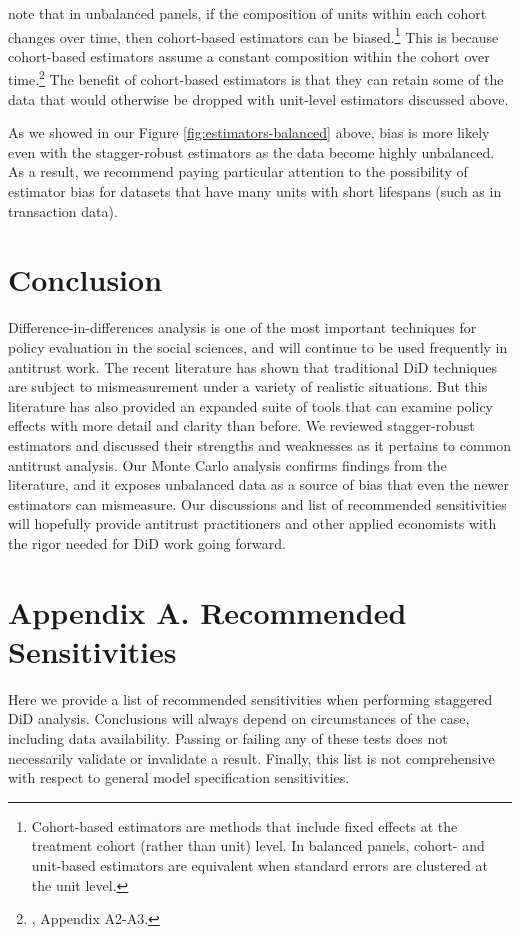 \documentclass[12pt]{article}
\begin{document}
\citet{borusyak2024revisiting} note that in unbalanced panels, if the composition of units within each cohort changes over time, then cohort-based estimators can be biased.\footnote{Cohort-based estimators are methods that include fixed effects at the treatment cohort (rather than unit) level. In balanced panels, cohort- and unit-based estimators are equivalent when standard errors are clustered at the unit level.}  This is because cohort-based estimators assume a constant composition within the cohort over time.\footnote{\citet{borusyak2024revisiting}, Appendix A2-A3.}  The benefit of cohort-based estimators is that they can retain some of the data that would otherwise be dropped with unit-level estimators discussed above.

As we showed in our Figure \ref{fig:estimators-balanced} above, bias is more likely even with the stagger-robust estimators as the data become highly unbalanced. As a result, we recommend paying particular attention to the possibility of estimator bias for datasets that have many units with short lifespans (such as in transaction data).

\section{Conclusion} \label{sec:conclusion}
Difference-in-differences analysis is one of the most important techniques for policy evaluation in the social sciences, and will continue to be used frequently in antitrust work. The recent literature has shown that traditional DiD techniques are subject to mismeasurement under a variety of realistic situations. But this literature has also provided an expanded suite of tools that can examine policy effects with more detail and clarity than before. We reviewed stagger-robust estimators and discussed their strengths and weaknesses as it pertains to common antitrust analysis. Our Monte Carlo analysis confirms findings from the literature, and it exposes unbalanced data as a source of bias that even the newer estimators can mismeasure. Our discussions and list of recommended sensitivities will hopefully provide antitrust practitioners and other applied economists with the rigor needed for DiD work going forward.

\newpage
\doublespace
\printbibliography
{}

\newpage
\section*{Appendix A. Recommended Sensitivities} \label{sec:appendixa}
Here we provide a list of recommended sensitivities when performing staggered DiD analysis. Conclusions will always depend on circumstances of the case, including data availability. Passing or failing any of these tests does not necessarily validate or invalidate a result. Finally, this list is not comprehensive with respect to general model specification sensitivities.
\end{document}
